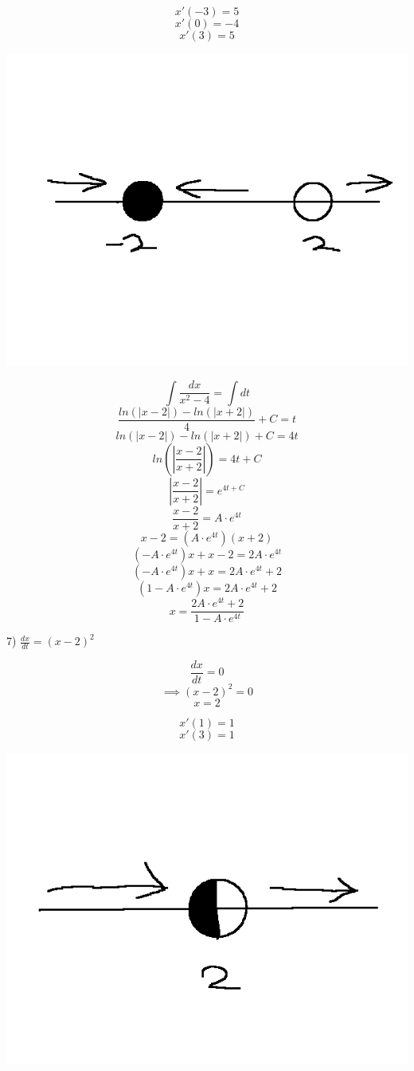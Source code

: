 \documentclass{article}
\begin{document}
\[x'(-3) = 5\]
\[x'(0) = -4\]
\[x'(3) = 5\]


\includegraphics[width=\linewidth]{problem_5}



\[\int \frac{dx}{x^2 - 4} = \int dt\]
\[\frac{ln(|x-2|) - ln(|x+2|)}{4} + C = t\]
\[ln(|x-2|) - ln(|x+2|) + C = 4t\]
\[ln(|\frac{x-2}{x+2}|) = 4t + C\]
\[|\frac{x-2}{x+2}| = e^{4t + C}\]
\[\frac{x-2}{x+2} = A \cdot e^{4t}\]
\[x-2 = (A \cdot e^{4t})(x+2)\]
\[(-A \cdot e^{4t})x + x - 2 = 2A \cdot e^{4t}\]
\[(-A \cdot e^{4t})x + x = 2A \cdot e^{4t} + 2\]
\[(1-A \cdot e^{4t})x = 2A \cdot e^{4t} + 2\]
\[x = \frac{2A \cdot e^{4t} + 2}{1-A \cdot e^{4t}}\]



7) $\frac{dx}{dt} = (x-2)^2$

\[\frac{dx}{dt} = 0\]
\[\implies (x-2)^2 = 0\]
\[x = 2\]


\[x'(1) = 1\]
\[x'(3) = 1\]


\includegraphics[width=\linewidth]{problem_7}
\end{document}
